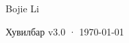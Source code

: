 \begin{titlepage}
\vfill
{\LARGE\sffamily Bojie Li\par}
\vspace{0.7cm}
{\small\sffamily\color{structurecolor!80} Хувилбар v3.0 · \today\par}
\vspace{1.2cm}
\end{titlepage}
